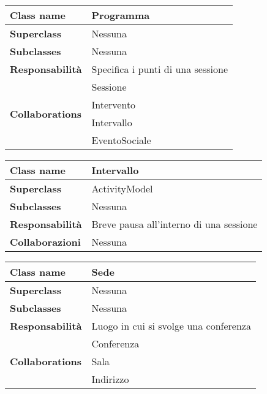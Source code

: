 \begin{table}[h!]
	\begin{tabular}{|l|l|}
		\hline
		\textbf{Class name} & Programma \\ \hline
		\textbf{Superclass} & Nessuna \\ \hline
		\textbf{Subclasses} & Nessuna  \\ \hline
		\textbf{Responsabilità} & Specifica i punti di una sessione \\ \hline
		\multirow{4}{*}{\textbf{Collaborations}} & Sessione \\ 
		& Intervento \\
		& Intervallo \\
		& EventoSociale \\ \hline
	\end{tabular}
\end{table}
\begin{table}[h!]
	\begin{tabular}{|l|l|}
		\hline
		\textbf{Class name} & Intervallo \\ \hline
		\textbf{Superclass} & ActivityModel \\ \hline
		\textbf{Subclasses} & Nessuna  \\ \hline
		\textbf{Responsabilità} & Breve pausa all'interno di una sessione \\ \hline
		\textbf{Collaborazioni} & Nessuna \\ \hline
	\end{tabular}
\end{table}
\begin{table}[h!]
	\begin{tabular}{|l|l|}
		\hline
		\textbf{Class name} & Sede \\ \hline
		\textbf{Superclass} & Nessuna \\ \hline
		\textbf{Subclasses} & Nessuna  \\ \hline
		\textbf{Responsabilità} & Luogo in cui si svolge una conferenza\\ \hline
		\multirow{3}{*}{\textbf{Collaborations}} & Conferenza \\ 
		& Sala \\ 
		& Indirizzo \\ \hline
\end{tabular}
\end{table}

